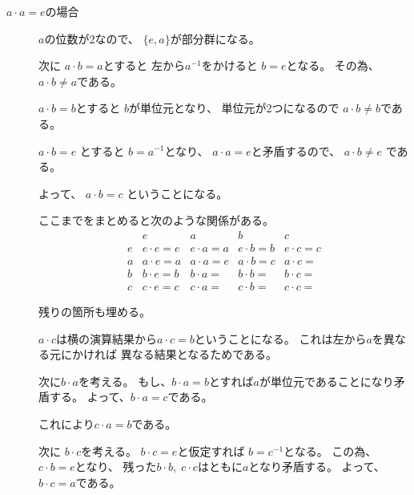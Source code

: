 \documentclass[12pt,b5paper]{ltjsarticle}
\begin{document}
\begin{description}
 \item [$a\cdot a=e$の場合]

             $a$の位数が2なので、
             $\{e,a\}$が部分群になる。

             次に
             $a\cdot b=a$とすると
             左から$a^{-1}$をかけると
             $b=e$となる。
             その為、
             $a\cdot b \ne a$である。

             $a\cdot b=b$とすると
             $b$が単位元となり、
             単位元が2つになるので
             $a\cdot b \ne b$である。

             $a\cdot b = e$ とすると
             $b = a^{-1}$となり、
             $a\cdot a=e$と矛盾するので、
             $a\cdot b \ne e$ である。

             よって、
             $a\cdot b = c$
             ということになる。

             ここまでをまとめると次のような関係がある。
             \begin{equation}
              \begin{array}{c|cccc}
                & e & a & b & c \\
               \hline
               e & e\cdot e = e & e\cdot a = a & e\cdot b=b & e\cdot c =c \\
               a & a\cdot e = a & a\cdot a = e & a\cdot b=c & a\cdot c = \\
               b & b\cdot e = b & b\cdot a =  & b\cdot b= & b\cdot c = \\
               c & c\cdot e = c & c\cdot a =  & c\cdot b= & c\cdot c = 
              \end{array}
             \end{equation}

             残りの箇所も埋める。

             $a\cdot c$は横の演算結果から$a\cdot c = b$ということになる。
             これは左から$a$を異なる元にかければ
             異なる結果となるためである。

             次に$b\cdot a$を考える。
             もし、$b\cdot a = b$とすれば$a$が単位元であることになり矛盾する。
             よって、$b\cdot a = c$である。

             これにより$c\cdot a = b$である。

             次に
             $b\cdot c$を考える。
             $b\cdot c =e$と仮定すれば
             $b= c^{-1}$となる。
             この為、
             $c\cdot b=e$となり、
             残った$b\cdot b, \; c\cdot c$はともに$a$となり矛盾する。
             よって、$b\cdot c =a$である。


\end{description}
\end{document}
